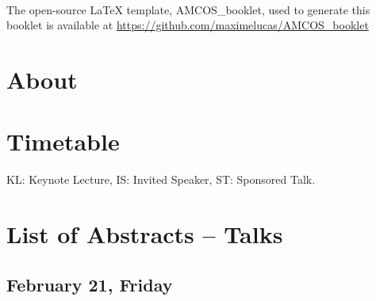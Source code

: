 \documentclass[openany, parskip=full, 12pt, a4]{scrbook}
\begin{document}
	
	
\mbox{}
\thispagestyle{empty}
\vfill
\begin{center}
	\\[20pt] %
	The open-source \LaTeX{} template, AMCOS\_booklet, used to generate this booklet is available at \url{https://github.com/maximelucas/AMCOS\_booklet}
\end{center}

\newpage

\tableofcontents

\chapter{About}



\chapter{Timetable}

KL: Keynote Lecture, IS: Invited Speaker, ST: Sponsored Talk.


\chapter{List of Abstracts -- Talks}

\section{February 21, Friday}

\end{document}
